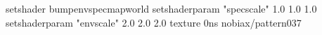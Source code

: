 setshader bumpenvspecmapworld
setshaderparam "specscale" 1.0 1.0 1.0
setshaderparam "envscale"  2.0 2.0 2.0
texture 0ns nobiax/pattern037